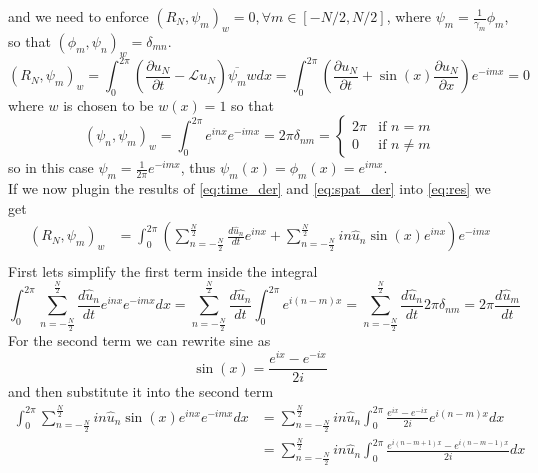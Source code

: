 and we need to enforce $\left(R_N, \psi_m\right)_w=0, \forall m \in[-N / 2, N / 2]$, where $\psi_m=\frac{1}{\gamma_m} \phi_m$, so that $\left(\phi_m, \psi_n\right)_w=\delta_{m n}$.
\begin{equation}
	\left(R_N, \psi_m\right)_w = \int_0^{2\pi} \left(\frac{\partial u_N}{\partial t}-\mathcal{L} u_N \right)\overline{\psi_m}wdx = \int_0^{2\pi} \left (  \frac{\partial u_N}{\partial t}+\sin (x) \frac{\partial u_N}{\partial x} \right) e^{-imx} = 0
	\label{eq:res}
\end{equation}
where $w$ is chosen to be $w(x) = 1$ so that
\begin{equation}
	(\psi_n, \psi_m)_w = \int_0^{2\pi} e^{inx} e^{-imx} = 2 \pi \delta_{nm} = \begin{cases}
		2 \pi & \text{if } n = m    \\
		0     & \text{if } n \neq m
	\end{cases}
	\label{eq:weight_f}
\end{equation}
so in this case $\psi_m = \frac{1}{2\pi}e^{-imx}$, thus $\psi_m(x) = \phi_m(x) = e^{imx}$. \\
If we now plugin the results of \eqref{eq:time_der} and \eqref{eq:spat_der} into \eqref{eq:res} we get
\begin{equation}
	\begin{aligned}
		\left(R_N, \psi_m\right)_w & = \int_0^{2\pi} \left (  \sum_{n=-\frac{N}{2}}^{\frac{N}{2}} \frac{d \hat{u}_n}{dt} e^{inx} +   \sum_{n=-\frac{N}{2}}^{\frac{N}{2}} i n \hat{u}_n \sin(x)  e^{inx} \right) e^{-imx} \\
	\end{aligned}
	\label{eq:res_der}
\end{equation}
First lets simplify the first term inside the integral
\begin{equation}
	\int_0^{2 \pi} \sum_{n=-\frac{N}{2}}^{\frac{N}{2}}  \frac{d \hat{u}_n}{dt} e^{inx}  e^{-imx} dx = \sum_{n=-\frac{N}{2}}^{\frac{N}{2}}  \frac{d \hat{u}_n}{dt} \int_0^{2 \pi} e^{i(n-m)x} = \sum_{n=-\frac{N}{2}}^{\frac{N}{2}}  \frac{d \hat{u}_n}{dt} 2 \pi \delta_{nm} = 2 \pi \frac{d \hat{u}_m}{dt}
	\label{eq:res_first}
\end{equation}
For the second term we can rewrite sine as
\begin{equation}
	\sin(x) = \frac{e^{ix} - e^{-ix}}{2i}
	\label{eq:sin_exp}
\end{equation}
and then substitute it into the second term
\begin{equation}
	\begin{aligned}
		\int_0^{2\pi} \sum_{n=-\frac{N}{2}}^{\frac{N}{2}} i n \hat{u}_n \sin(x)  e^{inx} e^{-imx} dx & =  \sum_{n=-\frac{N}{2}}^{\frac{N}{2}} i n \hat{u}_n  \int_0^{2\pi} \frac{e^{ix} - e^{-ix}}{2i} e^{i(n-m)x} dx       \\
		                                                                                             & =   \sum_{n=-\frac{N}{2}}^{\frac{N}{2}} i n \hat{u}_n  \int_0^{2\pi} \frac{e^{i(n-m + 1)x} - e^{i(n-m -1) x}}{2i} dx \\
		\label{eq:res_second}
	\end{aligned}
\end{equation}
